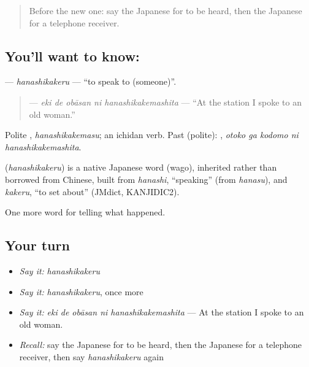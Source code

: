 \label{lesson:JA-C308-hanashikakeru}



\begin{quote}
Before the new one: say the Japanese for to be heard, then the Japanese for a telephone receiver.
\end{quote}

\subsection*{You'll want to know: }
\textbf{} — \emph{hanashikakeru} — \textquotedblleft{}to speak to (someone)\textquotedblright{}.

\begin{quote}
\textbf{  } — \emph{eki de obāsan ni hanashikakemashita} — \textquotedblleft{}At the station I spoke to an old woman.\textquotedblright{}
\end{quote}

Polite \textbf{}, \emph{hanashikakemasu}; an ichidan verb. Past (polite): \textbf{  }, \emph{otoko ga kodomo ni hanashikakemashita}.

\begin{cousinweb}
\textbf{} (\emph{hanashikakeru}) is a native Japanese word (wago), inherited rather than borrowed from Chinese, built from \emph{hanashi}, \textquotedblleft{}speaking\textquotedblright{} (from \emph{hanasu}), and \emph{kakeru}, \textquotedblleft{}to set about\textquotedblright{} (JMdict, KANJIDIC2).
\end{cousinweb}

\begin{grammarlens}[title={What you've built}]
One more word for telling what happened.
\end{grammarlens}

\subsection*{Your turn}
\begin{itemize}
\raggedright
  \item \emph{Say it:} \emph{hanashikakeru}
  \item \emph{Say it:} \emph{hanashikakeru}, once more
  \item \emph{Say it:} \emph{eki de obāsan ni hanashikakemashita} — At the station I spoke to an old woman.
  \item \emph{Recall:} say the Japanese for to be heard, then the Japanese for a telephone receiver, then say \emph{hanashikakeru} again
\end{itemize}

